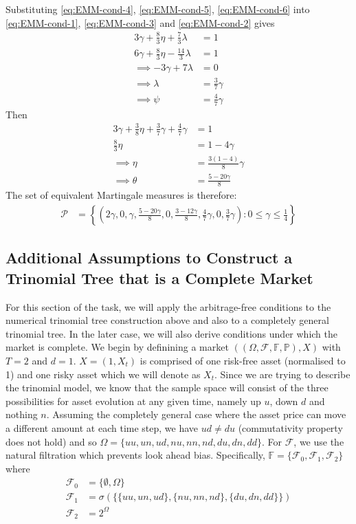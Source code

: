 \documentclass{article}
\begin{document}
Substituting \ref{eq:EMM-cond-4}, \ref{eq:EMM-cond-5}, \ref{eq:EMM-cond-6} into \ref{eq:EMM-cond-1}, \ref{eq:EMM-cond-3} and \ref{eq:EMM-cond-2} gives
\begin{align*}
    3\gamma + \frac{8}{3}\eta + \frac{7}{3}\lambda & = 1 \\
    6\gamma + \frac{8}{3}\eta - \frac{14}{3}\lambda & = 1 \\
    \implies -3\gamma + 7\lambda & = 0 \\
    \implies \lambda & = \frac{3}{7}\gamma \\
    \implies \psi & = \frac{4}{7}\gamma
\end{align*}
Then
\begin{align*}
    3\gamma+\frac{3}{8}\eta + \frac{3}{7}\gamma + \frac{4}{7}\gamma & = 1 \\
    \frac{8}{3}\eta & = 1 - 4\gamma \\
    \implies \eta & = \frac{3(1-4)}{8}\gamma \\
    \implies \theta & = \frac{5-20\gamma}{8}
\end{align*}
The set of equivalent Martingale measures is therefore:
\begin{align*}
    \mathcal{P} & =\left\{ \left(2\gamma,0,\gamma,\frac{5-20\gamma}{8},0,\frac{3-12\gamma}{8},\frac{4}{7}\gamma,0,\frac{3}{7}\gamma\right): 0\le\gamma\le\frac{1}{4}\right\}
\end{align*}

\subsection{Additional Assumptions to Construct a Trinomial Tree that is a Complete Market}
For this section of the task, we will apply the arbitrage-free conditions to the numerical trinomial tree construction above and also to a completely general trinomial tree. In the later case, we will also derive conditions under which the market is complete. We begin by definining a market $((\Omega, \mathcal{F},\mathbb{F},\mathbb{P}),X)$ with $T=2$ and $d=1$. $X = (1,X_t)$ is comprised of one risk-free asset (normalised to 1) and one risky asset which we will denote as $X_t$. Since we are trying to describe the trinomial model, we know that the sample space will consist of the three possibilities for asset evolution at any given time, namely up $u$, down $d$ and nothing $n$. Assuming the completely general case where the asset price can move a different amount at each time step, we have $ud\neq du$ (commutativity property does not hold) and so $\Omega = \{uu,un,ud,nu,nn,nd,du,dn,dd\}$. For $\mathcal{F}$, we use the natural filtration which prevents look ahead bias. Specifically, $\mathbb{F} = \{\mathcal{F}_0, \mathcal{F}_1, \mathcal{F}_2\}$ where
\begin{align*}
    \mathcal{F}_0 &= \{\emptyset,\Omega\} \\
    \mathcal{F}_1 &= \sigma(\{\{uu,un,ud\},\{nu,nn,nd\},\{du,dn,dd\}\}) \\
    \mathcal{F}_2 &= 2^\Omega
\end{align*}
\end{document}
